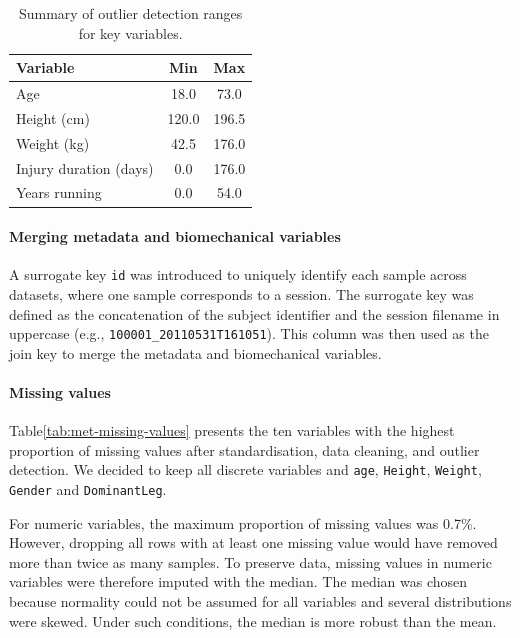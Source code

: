 \begin{table}[htbp]
    \centering
    \caption[Outlier detection range for tabular data]{Summary of outlier detection ranges for key variables.\label{tab:met-outlier-range}}
    \begin{tabular}{lcc}
        \hline
        \textbf{Variable} & \textbf{Min} & \textbf{Max} \\
        \hline
        Age & 18.0 & 73.0 \\
        Height (cm) & 120.0 & 196.5 \\
        Weight (kg) & 42.5 & 176.0 \\
        Injury duration (days) & 0.0 & 176.0 \\
        Years running & 0.0 & 54.0 \\
        \hline
    \end{tabular}
\end{table}


\paragraph{Merging metadata and biomechanical variables}
A surrogate key \texttt{id} was introduced to uniquely identify each sample across datasets, where one sample corresponds to a session. The surrogate key was defined as the concatenation of the subject identifier and the session filename in uppercase (e.g., \texttt{100001\_20110531T161051}). This column was then used as the join key to merge the metadata and biomechanical variables.

\paragraph{Missing values}
Table\ref{tab:met-missing-values} presents the ten variables with the highest proportion of missing values after standardisation, data cleaning, and outlier detection. We decided to keep all discrete variables and \texttt{age}, \texttt{Height}, \texttt{Weight}, \texttt{Gender} and \texttt{DominantLeg}.

For numeric variables, the maximum proportion of missing values was 0.7\%. However, dropping all rows with at least one missing value would have removed more than twice as many samples. To preserve data, missing values in numeric variables were therefore imputed with the median. The median was chosen because normality could not be assumed for all variables and several distributions were skewed. Under such conditions, the median is more robust than the mean.

